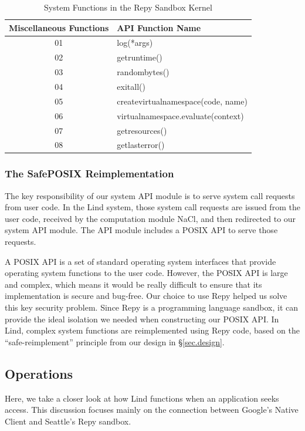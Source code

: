 \begin{table}
\begin{tabular}{|c|l|}
  \textbf{Miscellaneous Functions} & \textbf{API Function Name} \\
  \hline
  01 & log(*args) \\
  \hline
  02 & getruntime() \\
  \hline
  03 & randombytes() \\
  \hline
  04 & exitall() \\
  \hline
  05 & createvirtualnamespace(code, name) \\
  \hline
  06 & virtualnamespace.evaluate(context) \\
  \hline
  07 & getresources() \\
  \hline
  08 & getlasterror() \\
  \hline
\end{tabular}
\caption {System Functions in the Repy Sandbox Kernel}
\label{table:RepyKernel}
\end{table}

\subsubsection{The SafePOSIX Reimplementation}

The key responsibility of our system API module is to serve system call requests from user code. 
In the Lind system, those system call requests are issued from the user code, 
received by the computation module NaCl, and then redirected to our system API module. 
The API module includes a POSIX API to serve those requests. 

A POSIX API is a set of standard operating system interfaces that provide operating system functions 
to the user code. However, the POSIX API is large and complex, which means 
it would be really difficult to ensure that its implementation is secure and bug-free. 
Our choice to use Repy helped us solve this key security problem. 
Since Repy is a programming language sandbox, it can provide the ideal isolation 
we needed when constructing our POSIX API. In Lind, 
complex system functions are reimplemented using Repy code, 
based on the ``safe-reimplement'' principle from our design in \S{\ref{sec.design}}.

\subsection{Operations}

Here, we take a closer look at how Lind functions when an application seeks access. 
This discussion focuses mainly on the connection between Google's Native Client and Seattle's Repy sandbox.

